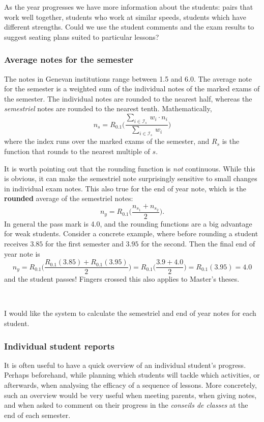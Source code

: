 \documentclass[10pt]{article}
\begin{document}
As the year progresses we have more information about the students: pairs that work well together, students who work at similar speeds, students which have different strengths. Could we use the student comments and the exam results to suggest seating plans suited to particular lessons?

\subsubsection{Average notes for the semester} \label{output_notes}

The notes in Genevan institutions range between 1.5 and 6.0. The average note for the semester is a weighted sum of the individual notes of the marked exams of the semester. The individual notes are rounded to the nearest half, whereas the \emph{semestriel} notes are rounded to the nearest tenth. Mathematically, 
$$ n_s = R_{0.1} \Bigg(\frac{\sum_{i \in \mathcal{I}_s} \, w_i \cdot n_i }{\sum_{i \in \mathcal{I}_s} \, w_i}\Bigg)$$
where the index runs over the marked exams of the semester, and $R_s$ is the function that rounds to the nearest multiple of $s$.

It is worth pointing out that the rounding function is \emph{not} continuous. While this is obvious, it can make the semestriel note surprisingly sensitive to small changes in individual exam notes. This also true for the end of year note, which is the \textbf{rounded} average of the semestriel notes:
$$n_y = R_{0.1} \Bigg( \frac{n_{s_1} + n_{s_2}}{2} \Bigg).$$
In general the pass mark is 4.0, and the rounding functions are a big advantage for weak students. Consider a concrete example, where before rounding a student receives $3.85$ for the first semester and $3.95$ for the second. Then the final end of year note is
$$n_y = R_{0.1}  \Bigg( \frac{R_{0.1}(3.85) +R_{0.1}(3.95)}{2} \Bigg) = R_{0.1} \Bigg( \frac{3.9 + 4.0}{2} \Bigg) = R_{0.1}(3.95) = 4.0$$
and the student passes! Fingers crossed this also applies to Master's theses.

\

I would like the system to calculate the semestriel and end of year notes for each student.

\subsubsection{Individual student reports} \label{output_report}

It is often useful to have a quick overview of an individual student's progress. Perhaps beforehand, while planning which students will tackle which activities, or afterwards, when analysing the efficacy of a sequence of lessons. More concretely, such an overview would be very useful when meeting parents, when giving notes, and when asked to comment on their progress in the \emph{conseils de classes} at the end of each semester.
\end{document}
